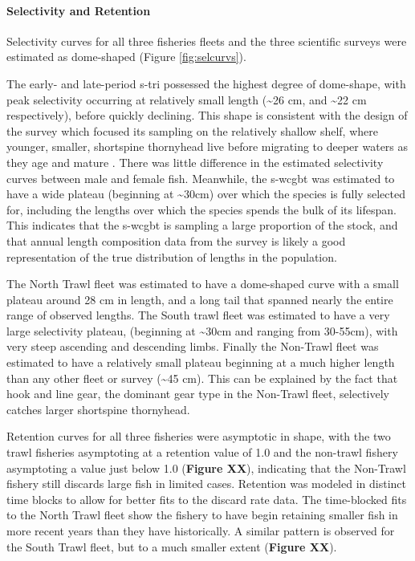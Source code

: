 \documentclass[11pt,
  english,
  letterpaper,
]{article}
\begin{document}
\hypertarget{selectivity-and-retention-1}{%
\paragraph{Selectivity and Retention}\label{selectivity-and-retention-1}}

Selectivity curves for all three fisheries fleets and the three scientific surveys were estimated as dome-shaped (Figure \ref{fig:selcurvs}).

The early- and late-period \gls{s-tri} possessed the highest degree of dome-shape, with peak selectivity occurring at relatively small length (\textasciitilde26 cm, and \textasciitilde22 cm respectively), before quickly declining. This shape is consistent with the design of the survey which focused its sampling on the relatively shallow shelf, where younger, smaller, shortspine thornyhead live before migrating to deeper waters as they age and mature . There was little difference in the estimated selectivity curves between male and female fish. Meanwhile, the \gls{s-wcgbt} was estimated to have a wide plateau (beginning at \textasciitilde30cm) over which the species is fully selected for, including the lengths over which the species spends the bulk of its lifespan. This indicates that the \gls{s-wcgbt} is sampling a large proportion of the stock, and that annual length composition data from the survey is likely a good representation of the true distribution of lengths in the population.

The North Trawl fleet was estimated to have a dome-shaped curve with a small plateau around 28 cm in length, and a long tail that spanned nearly the entire range of observed lengths. The South trawl fleet was estimated to have a very large selectivity plateau, (beginning at \textasciitilde30cm and ranging from 30-55cm), with very steep ascending and descending limbs. Finally the Non-Trawl fleet was estimated to have a relatively small plateau beginning at a much higher length than any other fleet or survey (\textasciitilde45 cm). This can be explained by the fact that hook and line gear, the dominant gear type in the Non-Trawl fleet, selectively catches larger shortspine thornyhead.

Retention curves for all three fisheries were asymptotic in shape, with the two trawl fisheries asymptoting at a retention value of 1.0 and the non-trawl fishery asymptoting a value just below 1.0 (\textbf{Figure XX}), indicating that the Non-Trawl fishery still discards large fish in limited cases. Retention was modeled in distinct time blocks to allow for better fits to the discard rate data. The time-blocked fits to the North Trawl fleet show the fishery to have begin retaining smaller fish in more recent years than they have historically. A similar pattern is observed for the South Trawl fleet, but to a much smaller extent (\textbf{Figure XX}).
\end{document}
